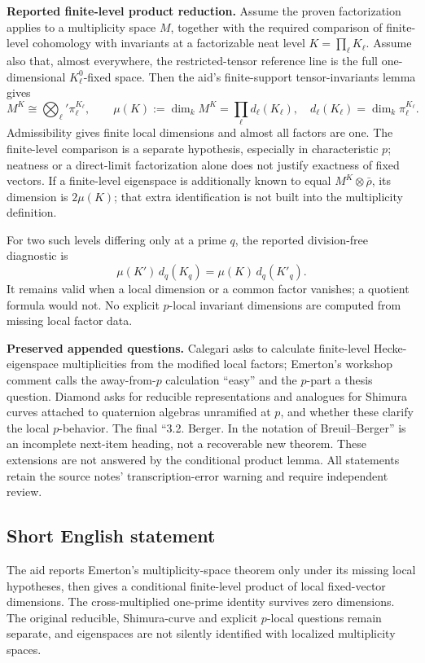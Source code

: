 \documentclass[11pt]{article}
\begin{document}
\textbf{Reported finite-level product reduction.} Assume the proven factorization applies to a multiplicity space \(M\), together with the required comparison of finite-level cohomology with invariants at a factorizable neat level \(K=\prod_\ell K_\ell\). Assume also that, almost everywhere, the restricted-tensor reference line is the full one-dimensional \(K_\ell^0\)-fixed space. Then the aid's finite-support tensor-invariants lemma gives
\[
 M^K\cong\bigotimes_\ell'\pi_\ell^{K_\ell},\qquad
 \mu(K):=\dim_kM^K=\prod_\ell d_\ell(K_\ell),
 \quad d_\ell(K_\ell)=\dim_k\pi_\ell^{K_\ell}.
\]
Admissibility gives finite local dimensions and almost all factors are one. The finite-level comparison is a separate hypothesis, especially in characteristic \(p\); neatness or a direct-limit factorization alone does not justify exactness of fixed vectors. If a finite-level eigenspace is additionally known to equal \(M^K\otimes\bar\rho\), its dimension is \(2\mu(K)\); that extra identification is not built into the multiplicity definition.

For two such levels differing only at a prime \(q\), the reported division-free diagnostic is
\[
 \mu(K')\,d_q(K_q)=\mu(K)\,d_q(K'_q).
\]
It remains valid when a local dimension or a common factor vanishes; a quotient formula would not. No explicit \(p\)-local invariant dimensions are computed from missing local factor data.

\textbf{Preserved appended questions.} Calegari asks to calculate finite-level Hecke-eigenspace multiplicities from the modified local factors; Emerton's workshop comment calls the away-from-\(p\) calculation ``easy'' and the \(p\)-part a thesis question. Diamond asks for reducible representations and analogues for Shimura curves attached to quaternion algebras unramified at \(p\), and whether these clarify the local \(p\)-behavior. The final ``3.2. Berger. In the notation of Breuil--Berger'' is an incomplete next-item heading, not a recoverable new theorem. These extensions are not answered by the conditional product lemma. All statements retain the source notes' transcription-error warning and require independent review.
\subsection{Short English statement}
The aid reports Emerton's multiplicity-space theorem only under its missing local hypotheses, then gives a conditional finite-level product of local fixed-vector dimensions. The cross-multiplied one-prime identity survives zero dimensions. The original reducible, Shimura-curve and explicit \(p\)-local questions remain separate, and eigenspaces are not silently identified with localized multiplicity spaces.
\end{document}
